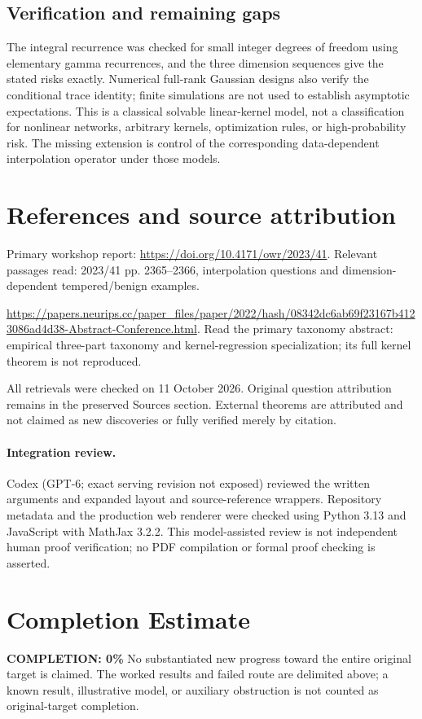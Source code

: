 \documentclass[11pt]{article}
\begin{document}
\subsection{Verification and remaining gaps}
The integral recurrence was checked for small integer degrees of freedom using elementary gamma recurrences, and the three dimension sequences give the stated risks exactly. Numerical full-rank Gaussian designs also verify the conditional trace identity; finite simulations are not used to establish asymptotic expectations. This is a classical solvable linear-kernel model, not a classification for nonlinear networks, arbitrary kernels, optimization rules, or high-probability risk. The missing extension is control of the corresponding data-dependent interpolation operator under those models.

\section{References and source attribution}
Primary workshop report: \url{https://doi.org/10.4171/owr/2023/41}. Relevant passages read: 2023/41 pp. 2365--2366, interpolation questions and dimension-dependent tempered/benign examples.

\url{https://papers.neurips.cc/paper_files/paper/2022/hash/08342dc6ab69f23167b4123086ad4d38-Abstract-Conference.html}. Read the primary taxonomy abstract: empirical three-part taxonomy and kernel-regression specialization; its full kernel theorem is not reproduced.

All retrievals were checked on 11 October 2026. Original question attribution remains in the preserved Sources section. External theorems are attributed and not claimed as new discoveries or fully verified merely by citation.


\paragraph{Integration review.} Codex (GPT-6; exact serving revision not exposed) reviewed the written arguments and expanded layout and source-reference wrappers. Repository metadata and the production web renderer were checked using Python 3.13 and JavaScript with MathJax 3.2.2. This model-assisted review is not independent human proof verification; no PDF compilation or formal proof checking is asserted.

\section{Completion Estimate}
\noindent\textbf{COMPLETION: 0\%}
No substantiated new progress toward the entire original target is claimed. The worked results and failed route are delimited above; a known result, illustrative model, or auxiliary obstruction is not counted as original-target completion.
\end{document}
